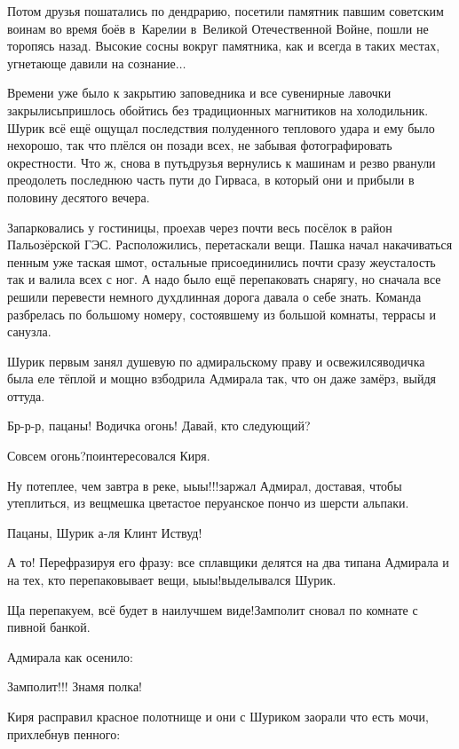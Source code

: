 Потом друзья пошатались по дендрарию, посетили памятник павшим советским воинам во время боёв в~Карелии в~Великой Отечественной Войне, пошли не торопясь назад. Высокие сосны вокруг памятника, как и всегда в таких местах, угнетающе давили на сознание$\ldots$ 

Времени уже было к закрытию заповедника и все сувенирные лавочки закрылись\mdash пришлось обойтись без традиционных магнитиков на холодильник. Шурик всё ещё ощущал последствия полуденного теплового удара и ему было нехорошо, так что плёлся он позади всех, не забывая фотографировать окрестности. Что ж, снова в путь\mdash друзья вернулись к машинам и резво рванули преодолеть последнюю часть пути до Гирваса, в который они и прибыли в половину десятого вечера.

Запарковались у гостиницы, проехав через почти весь посёлок в район Пальозёрской ГЭС. Расположились, перетаскали вещи. Пашка начал накачиваться пенным уже таская шмот, остальные присоединились почти сразу же\mdash усталость так и валила всех с ног. А надо было ещё перепаковать снарягу, но сначала все решили перевести немного дух\mdash длинная дорога давала о себе знать. Команда разбрелась по большому номеру, состоявшему из большой комнаты, террасы и санузла. 

Шурик первым занял душевую по адмиральскому праву и освежился\mdash водичка была еле тёплой и мощно взбодрила Адмирала так, что он даже замёрз, выйдя оттуда.

\diagdash Бр-р-р, пацаны! Водичка огонь! Давай, кто следующий?

\diagdash Совсем огонь?\mdash поинтересовался Киря.

\diagdash Ну потеплее, чем завтра в реке, ы\sdash ы\sdash ы!!!\mdash заржал Адмирал, доставая, чтобы утеплиться, из вещмешка цветастое перуанское пончо из шерсти альпаки.

\diagdash Пацаны, Шурик а-ля Клинт Иствуд!

\diagdash А то! Перефразируя его фразу: все сплавщики делятся на два типа\mdash на Адмирала и на тех, кто перепаковывает вещи, ы\sdash ы\sdash ы!\mdash выделывался Шурик.

\diagdash Ща перепакуем, всё будет в наилучшем виде!\mdash Замполит сновал по комнате с пивной банкой.

Адмирала как осенило:

\diagdash Замполит!!! Знамя полка!

Киря расправил красное полотнище и они с Шуриком заорали что есть мочи, прихлебнув пенного:

